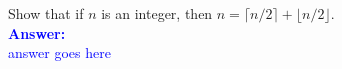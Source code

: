 \item{}
Show that if $n$ is an integer, then $n=\lceil n/2\rceil+\lfloor n/2\rfloor$.
\\[12pt]
\ifanswers
\textcolor{blue}{
\textbf{Answer:}\\[6pt]
answer goes here
}
\newpage
\fi
